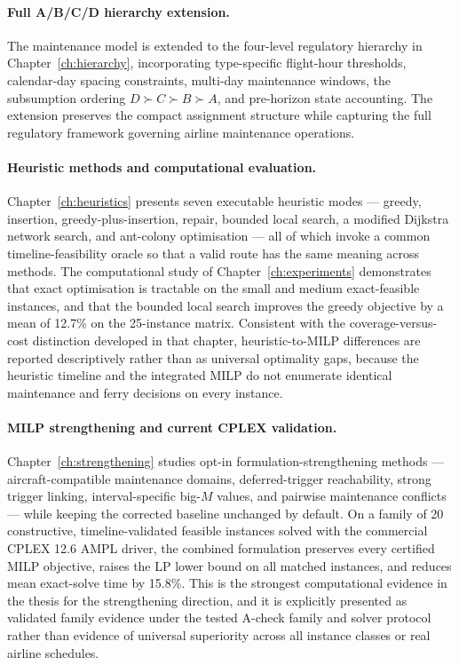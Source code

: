 \paragraph{Full A/B/C/D hierarchy extension.}
The maintenance model is extended to the four-level regulatory hierarchy in Chapter~\ref{ch:hierarchy}, incorporating type-specific flight-hour thresholds, calendar-day spacing constraints, multi-day maintenance windows, the subsumption ordering $D \succ C \succ B \succ A$, and pre-horizon state accounting. The extension preserves the compact assignment structure while capturing the full regulatory framework governing airline maintenance operations.

\paragraph{Heuristic methods and computational evaluation.}
Chapter~\ref{ch:heuristics} presents seven executable heuristic modes --- greedy, insertion, greedy-plus-insertion, repair, bounded local search, a modified Dijkstra network search, and ant-colony optimisation --- all of which invoke a common timeline-feasibility oracle so that a valid route has the same meaning across methods. The computational study of Chapter~\ref{ch:experiments} demonstrates that exact optimisation is tractable on the small and medium exact-feasible instances, and that the bounded local search improves the greedy objective by a mean of 12.7\% on the 25-instance matrix. Consistent with the coverage-versus-cost distinction developed in that chapter, heuristic-to-MILP differences are reported descriptively rather than as universal optimality gaps, because the heuristic timeline and the integrated MILP do not enumerate identical maintenance and ferry decisions on every instance.

\paragraph{MILP strengthening and current CPLEX validation.}
Chapter~\ref{ch:strengthening} studies opt-in formulation-strengthening methods --- aircraft-compatible maintenance domains, deferred-trigger reachability, strong trigger linking, interval-specific big-$M$ values, and pairwise maintenance conflicts --- while keeping the corrected baseline unchanged by default. On a family of 20 constructive, timeline-validated feasible instances solved with the commercial CPLEX 12.6 AMPL driver, the combined formulation preserves every certified MILP objective, raises the LP lower bound on all matched instances, and reduces mean exact-solve time by 15.8\%. This is the strongest computational evidence in the thesis for the strengthening direction, and it is explicitly presented as validated family evidence under the tested A-check family and solver protocol rather than evidence of universal superiority across all instance classes or real airline schedules.

